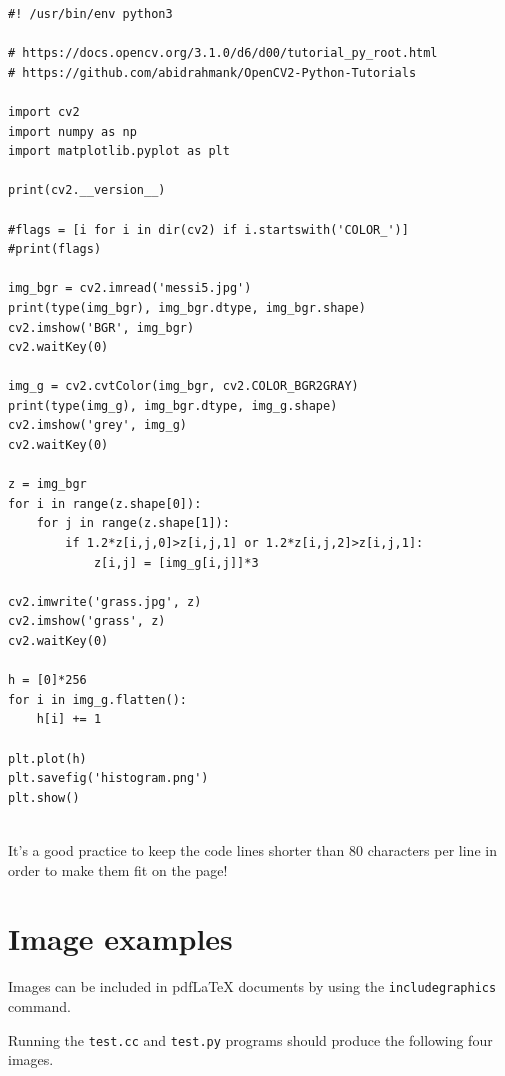 \documentclass{article}
\begin{document}
\begin{verbatim}
#! /usr/bin/env python3

# https://docs.opencv.org/3.1.0/d6/d00/tutorial_py_root.html
# https://github.com/abidrahmank/OpenCV2-Python-Tutorials

import cv2
import numpy as np
import matplotlib.pyplot as plt

print(cv2.__version__)

#flags = [i for i in dir(cv2) if i.startswith('COLOR_')]
#print(flags)

img_bgr = cv2.imread('messi5.jpg')
print(type(img_bgr), img_bgr.dtype, img_bgr.shape)
cv2.imshow('BGR', img_bgr)
cv2.waitKey(0)

img_g = cv2.cvtColor(img_bgr, cv2.COLOR_BGR2GRAY)
print(type(img_g), img_bgr.dtype, img_g.shape)
cv2.imshow('grey', img_g)
cv2.waitKey(0)

z = img_bgr
for i in range(z.shape[0]):
    for j in range(z.shape[1]):
        if 1.2*z[i,j,0]>z[i,j,1] or 1.2*z[i,j,2]>z[i,j,1]:
            z[i,j] = [img_g[i,j]]*3

cv2.imwrite('grass.jpg', z)
cv2.imshow('grass', z)
cv2.waitKey(0)
           
h = [0]*256
for i in img_g.flatten():
    h[i] += 1

plt.plot(h)
plt.savefig('histogram.png')
plt.show()


\end{verbatim}

It's a good practice to keep the code lines shorter than 80 characters
per line in order to make them fit on the page!

\section{Image examples}
\label{sec:images}

Images can be included in pdf\LaTeX{} documents by using the
\texttt{includegraphics} command.

Running the \texttt{test.cc} and \texttt{test.py} programs should
produce the following four images.

\bigskip
\noindent%
\setlength{\fboxsep}{0pt}%
\end{document}
